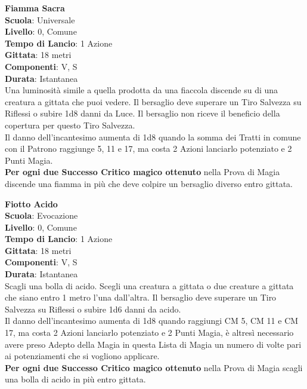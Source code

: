 \begin{multicols}{2}
\medskip\textbf{Fiamma Sacra}\\
\textbf{Scuola}: Universale\\
\textbf{Livello}: 0, Comune\\
\textbf{Tempo di Lancio}: 1 Azione\\
\textbf{Gittata}: 18 metri\\
\textbf{Componenti}: V, S\\
\textbf{Durata}: Istantanea\\
Una luminosità simile a quella prodotta da una fiaccola discende su di una creatura a gittata che puoi vedere. Il bersaglio deve superare un Tiro Salvezza su Riflessi o subire 1d8 danni da Luce. Il bersaglio non riceve il beneficio della copertura per questo Tiro Salvezza.\\
Il danno dell'incantesimo aumenta di 1d8 quando la somma dei Tratti in comune con il Patrono raggiunge 5, 11 e 17, ma costa 2 Azioni lanciarlo potenziato e 2 Punti Magia.\\
\textbf{Per ogni due Successo Critico magico ottenuto} nella Prova di Magia discende una fiamma in più che deve colpire un bersaglio diverso entro gittata.

\medskip\textbf{Fiotto Acido}\\
\textbf{Scuola}: Evocazione\\
\textbf{Livello}: 0, Comune\\
\textbf{Tempo di Lancio}: 1 Azione\\
\textbf{Gittata}: 18 metri\\
\textbf{Componenti}: V, S\\
\textbf{Durata}: Istantanea\\
Scagli una bolla di acido. Scegli una creatura a gittata o due creature a gittata che siano entro 1 metro l'una dall'altra. Il bersaglio deve superare un Tiro Salvezza su Riflessi o subire 1d6 danni da acido.\\
Il danno dell'incantesimo aumenta di 1d8 quando raggiungi CM 5, CM 11 e CM 17, ma costa 2 Azioni lanciarlo potenziato e 2 Punti Magia, è altresì necessario avere preso Adepto della Magia in questa Lista di Magia un numero di volte pari ai potenziamenti che si vogliono applicare.\\
\textbf{Per ogni due Successo Critico magico ottenuto} nella Prova di Magia scagli una bolla di acido in più entro gittata.


\end{multicols}

